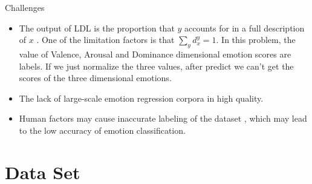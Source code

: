 \documentclass[
 size=14pt,
 paper=smartboard,  %
 mode=present, 		%
 display=slides, 	%
 style=tuliplab,  	%
 pauseslide,
 fleqn,leqno]{powerdot}
\begin{document}
\begin{slide}{Challenges }
\begin{itemize}
\item
The output of LDL is the proportion that 
$ y $ accounts for in a full description of $ x $ .
One of the limitation factors is that 
$ \sum_{y}  d^y_{x} = 1 $.
In this problem, the value of 
Valence, Arousal and Dominance 
dimensional emotion scores are labels.
If we just normalize the three values,
after predict we can't get the scores
of the three dimensional emotions.

\bigskip

\item
The lack of large-scale emotion regression corpora in high quality.

\bigskip

\item
Human factors may cause inaccurate labeling of the dataset , 
which may lead to the low accuracy of emotion classification.  

\end{itemize}


\end{slide}


\section{Data Set}
\end{document}

